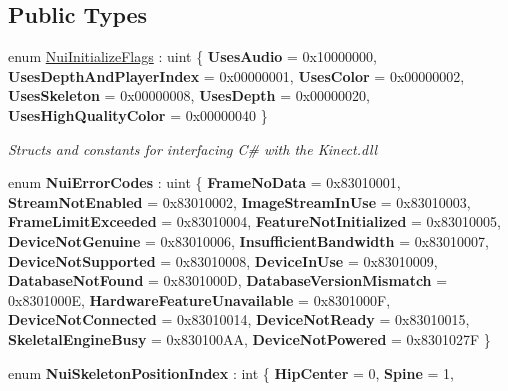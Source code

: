 \subsection*{Public Types}
\begin{DoxyCompactItemize}
\item 
enum \mbox{\hyperlink{class_kinect_wrapper_aa14891c91bfa8c6fe4761146055656da}{Nui\+Initialize\+Flags}} \+: uint \{ \newline
{\bfseries Uses\+Audio} = 0x10000000, 
{\bfseries Uses\+Depth\+And\+Player\+Index} = 0x00000001, 
{\bfseries Uses\+Color} = 0x00000002, 
{\bfseries Uses\+Skeleton} = 0x00000008, 
\newline
{\bfseries Uses\+Depth} = 0x00000020, 
{\bfseries Uses\+High\+Quality\+Color} = 0x00000040
 \}
\begin{DoxyCompactList}\small\item\em Structs and constants for interfacing C\# with the Kinect.\+dll \end{DoxyCompactList}\item 
\mbox{\label{class_kinect_wrapper_a556dfab4f288c786036c4a48c5a57799}} 
enum {\bfseries Nui\+Error\+Codes} \+: uint \{ \newline
{\bfseries Frame\+No\+Data} = 0x83010001, 
{\bfseries Stream\+Not\+Enabled} = 0x83010002, 
{\bfseries Image\+Stream\+In\+Use} = 0x83010003, 
{\bfseries Frame\+Limit\+Exceeded} = 0x83010004, 
\newline
{\bfseries Feature\+Not\+Initialized} = 0x83010005, 
{\bfseries Device\+Not\+Genuine} = 0x83010006, 
{\bfseries Insufficient\+Bandwidth} = 0x83010007, 
{\bfseries Device\+Not\+Supported} = 0x83010008, 
\newline
{\bfseries Device\+In\+Use} = 0x83010009, 
{\bfseries Database\+Not\+Found} = 0x8301000D, 
{\bfseries Database\+Version\+Mismatch} = 0x8301000E, 
{\bfseries Hardware\+Feature\+Unavailable} = 0x8301000F, 
\newline
{\bfseries Device\+Not\+Connected} = 0x83010014, 
{\bfseries Device\+Not\+Ready} = 0x83010015, 
{\bfseries Skeletal\+Engine\+Busy} = 0x830100\+AA, 
{\bfseries Device\+Not\+Powered} = 0x8301027F
 \}
\item 
\mbox{\label{class_kinect_wrapper_ad73682163ab4e6f554501574ab835f1c}} 
enum {\bfseries Nui\+Skeleton\+Position\+Index} \+: int \{ \newline
{\bfseries Hip\+Center} = 0, 
{\bfseries Spine} = 1, 

\end{DoxyCompactItemize}
